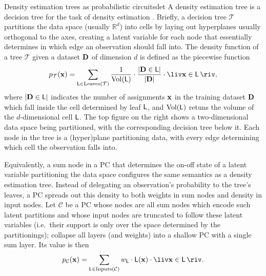 \begin{example}[sidebyside,lefthand width=0.55\textwidth]{Density estimation trees as probabilistic circuits}{det}
  A density estimation tree is a decision tree for the task of density estimation \citep{ram11}.
  Briefly, a decision tree $\mathcal{T}$ partitions the data space (usually $\mathbb{R}^d$) into
  cells by laying out hyperplanes usually orthogonal to the axes, creating a latent variable for
  each node that essentially determines in which edge an observation should fall into. The density
  function of a tree $\mathcal{T}$ given a dataset $\mathbf{D}$ of dimension $d$ is defined as the
  piecewise function
  \begin{equation}
    p_\mathcal{T}(\set{x})=\sum_{\Leaf\in\operatorname{Leaves}(\mathcal{T})}\frac{1}{\operatorname{Vol}(\Leaf)}\cdot\frac{\left|\set{D}\in\Leaf\right|}{|\set{D}|}\cdot\liv\set{x}\in\Leaf\riv,
  \end{equation}
  where $\left|\mathbf{D}\in\operatorname{\textup{\textsf{L}}}\right|$ indicates the number of assignments $\mathbf{x}$ in the
  training dataset $\mathbf{D}$ which fall inside the cell determined by leaf $\operatorname{\textup{\textsf{L}}}$, and
  $\operatorname{Vol}(\operatorname{\textup{\textsf{L}}})$ retuns the volume of the $d$-dimensional cell $\operatorname{\textup{\textsf{L}}}$. The top figure
  on the right shows a two-dimensional data space being partitioned, with the corresponding
  decision tree below it. Each node in the tree is a (hyper)plane partitioning data, with every
  edge determining which cell the observation falls into.

  Equivalently, a sum node in a PC that determines the on-off state of a latent variable
  partitioning the data space configures the same semantics as a density estimation tree. Instead
  of delegating an observation's probability to the tree's leaves, a PC spreads out this density to
  both weights in sum nodes and density in input nodes. Let $\mathcal{C}$ be a PC whose nodes are all
  sum nodes which encode such latent partitions and whose input nodes are truncated to follow these
  latent variables (i.e.\ their support is only over the space determined by the partitionings);
  collapse all layers (and weights) into a shallow PC with a single sum layer. Its value is then
  \begin{equation}
    p_\mathcal{C}(\set{x})=\sum_{\Leaf\in\operatorname{Inputs}(\mathcal{C})}w_{\Leaf}\cdot\Leaf(\set{x})\cdot\liv\set{x}\in\Leaf\riv.
  \end{equation}
  \tcblower
  \centering
\end{example}
